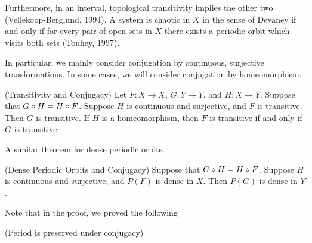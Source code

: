 \documentclass[12pt,draft,twoside]{book}
\begin{document}
Furthermore, in an interval, topological transitivity implies the other two (Vellekoop-Berglund, 1994).
A system is chaotic in $X$ in the sense of Devaney if and only if for every pair of open sets in $X$ there exists a periodic orbit which visits both sets (Touhey, 1997).

In particular, we mainly consider conjugation by continuous, surjective transformations.
In some cases, we will consider conjugation by homeomorphism.
\begin{theorem}
  (Transitivity and Conjugacy) 
  Let $F: X \to X$, $G: Y \to Y$, and $H: X \to Y$.
  Suppose that $G \circ H = H \circ F$.
  Suppose $H$ is continuous and surjective, and $F$ is transitive.
  Then $G$ is transitive.
  If $H$ is a homeomorphism, then $F$ is transitive if and only if $G$ is transitive.
\end{theorem}
A similar theorem for dense periodic orbits.
\begin{theorem}
  (Dense Periodic Orbits and Conjugacy) 
  Suppose that $G \circ H = H \circ F$.
  Suppose $H$ is continuous and surjective, and $P(F)$ is dense in $X$.
  Then $P(G)$ is dense in $Y$.
\end{theorem}
Note that in the proof, we proved the following
\begin{theorem}
  (Period is preserved under conjugacy)
\end{theorem}




\printindex
\end{document}

